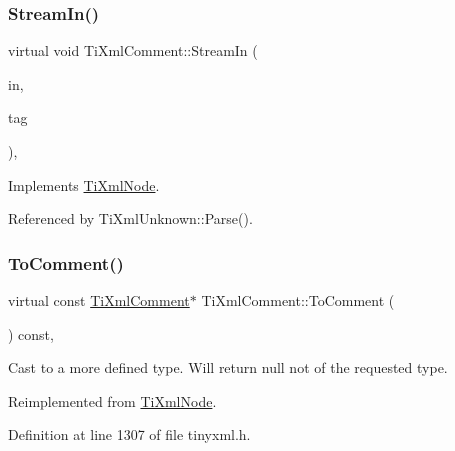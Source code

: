 \subsubsection{\texorpdfstring{Stream\+In()}{StreamIn()}}
{\footnotesize\ttfamily virtual void Ti\+Xml\+Comment\+::\+Stream\+In (\begin{DoxyParamCaption}\item[{std\+::istream $\ast$}]{in,  }\item[{\hyperlink{tinyxml_8h_a92bada05fd84d9a0c9a5bbe53de26887}{T\+I\+X\+M\+L\+\_\+\+S\+T\+R\+I\+NG} $\ast$}]{tag }\end{DoxyParamCaption})\hspace{0.3cm}{\ttfamily [protected]}, {\ttfamily [virtual]}}



Implements \hyperlink{class_ti_xml_node_ab4b4af1a6b486dcbc0e327cf291270af}{Ti\+Xml\+Node}.



Referenced by Ti\+Xml\+Unknown\+::\+Parse().

\hypertarget{class_ti_xml_comment_a1032e176d3eb73017ceabc698cac0f16}{}\label{class_ti_xml_comment_a1032e176d3eb73017ceabc698cac0f16} 
\subsubsection{\texorpdfstring{To\+Comment()}{ToComment()}\hspace{0.1cm}{\footnotesize\ttfamily [1/2]}}
{\footnotesize\ttfamily virtual const \hyperlink{class_ti_xml_comment}{Ti\+Xml\+Comment}$\ast$ Ti\+Xml\+Comment\+::\+To\+Comment (\begin{DoxyParamCaption}{ }\end{DoxyParamCaption}) const\hspace{0.3cm}{\ttfamily [inline]}, {\ttfamily [virtual]}}



Cast to a more defined type. Will return null not of the requested type. 



Reimplemented from \hyperlink{class_ti_xml_node_a5ad43b9d545315e9bb4f50d4cb70de9e}{Ti\+Xml\+Node}.



Definition at line 1307 of file tinyxml.\+h.

\hypertarget{class_ti_xml_comment_acc7c7e07e13c23f17797d642981511df}{}\label{class_ti_xml_comment_acc7c7e07e13c23f17797d642981511df} 
